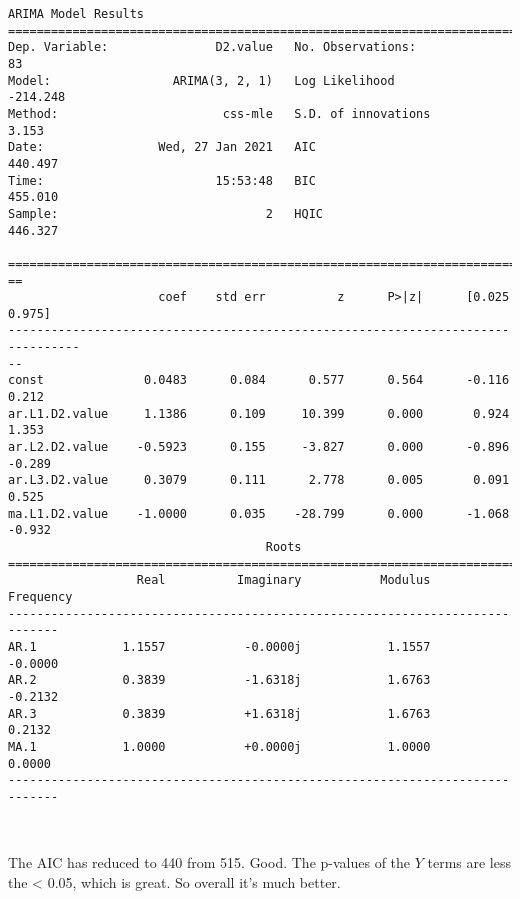 \documentclass[11pt]{article}
\begin{document}
    \begin{Verbatim}[commandchars=\\\{\}]
                             ARIMA Model Results
==============================================================================
Dep. Variable:               D2.value   No. Observations:                   83
Model:                 ARIMA(3, 2, 1)   Log Likelihood                -214.248
Method:                       css-mle   S.D. of innovations              3.153
Date:                Wed, 27 Jan 2021   AIC                            440.497
Time:                        15:53:48   BIC                            455.010
Sample:                             2   HQIC                           446.327

================================================================================
==
                     coef    std err          z      P>|z|      [0.025
0.975]
--------------------------------------------------------------------------------
--
const              0.0483      0.084      0.577      0.564      -0.116
0.212
ar.L1.D2.value     1.1386      0.109     10.399      0.000       0.924
1.353
ar.L2.D2.value    -0.5923      0.155     -3.827      0.000      -0.896
-0.289
ar.L3.D2.value     0.3079      0.111      2.778      0.005       0.091
0.525
ma.L1.D2.value    -1.0000      0.035    -28.799      0.000      -1.068
-0.932
                                    Roots
=============================================================================
                  Real          Imaginary           Modulus         Frequency
-----------------------------------------------------------------------------
AR.1            1.1557           -0.0000j            1.1557           -0.0000
AR.2            0.3839           -1.6318j            1.6763           -0.2132
AR.3            0.3839           +1.6318j            1.6763            0.2132
MA.1            1.0000           +0.0000j            1.0000            0.0000
-----------------------------------------------------------------------------
    \end{Verbatim}

    \begin{center}
    \end{center}
    { \hspace*{\fill} \\}
    
    The AIC has reduced to 440 from 515. Good. The p-values of the \(Y\)
terms are less the \textless{} 0.05, which is great. So overall it's
much better.
\end{document}
